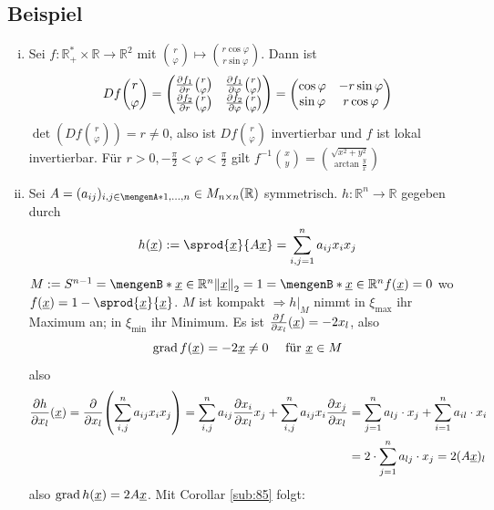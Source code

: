 \subsection{Beispiel} %
\label{sub:86}
\begin{enumerate}[(i)]
	\item Sei $f : \mathds{R}_+^* \times \mathds{R} \to \mathds{R}^2$ mit $\binom{r}{\varphi} \mapsto \binom{r \cos \varphi}{r \sin \varphi}  $. Dann ist
	\[
		D f \binom{r}{\varphi} = \begin{pmatrix}
			\frac{{\partial f_1}}{{\partial r}}  \binom{r}{\varphi}  & \frac{{\partial f_1}}{{\partial \varphi}}  \binom{r}{\varphi} \\
			\frac{{\partial f_2}}{{\partial r}}  \binom{r}{\varphi} & \frac{{\partial f_2}}{{\partial \varphi}}  \binom{r}{\varphi}     
		\end{pmatrix} = \begin{pmatrix}
			\cos \varphi & - r \sin \varphi \\
			\sin \varphi & r \cos \varphi
		\end{pmatrix}
	\]
	$\det (D f \binom{r}{\varphi} ) = r \not= 0$, also ist $D f \binom{r}{\varphi} $ invertierbar und $f$ ist lokal invertierbar. Für 
	$r>0, - \frac{\pi}{2} < \varphi < \frac{\pi}{2}$ gilt $f ^{-1} \binom{x}{y} = \binom{\sqrt{x^2+ y^2}}{\arctan \frac{y}{x} }    $
	\item Sei $A= (a_{ij})_{i,j \in \set{1, \ldots , n}}  \in M_{n\times n}(\mathds{R})$ symmetrisch. $h : \mathds{R}^n \to \mathds{R}$ gegeben durch
	\[
		h(\underline{x}) := \sprod{\underline{x}}{A \underline{x}} = \sum_{i,j =1}^{n} a_{ij} x_i x_j 
	\]
	$M:= S^{n-1} = \set[\underline{x} \in \mathds{R}^n]{ \norm[2]{\underline{x}} = 1 } = \set[\underline{x} \in \mathds{R}^n]{f(\underline{x})=0}  $ wo 
	$f(\underline{x}) = 1- \sprod{\underline{x}}{\underline{x}} $. $M$ ist kompakt $\Rightarrow h|_{M}$ nimmt in $\xi_{\max}$ ihr Maximum an; in $\xi_{\min}$ ihr Minimum.
	Es ist $\frac{{\partial f}}{{\partial x_l}}  (\underline{x})= - 2x_l $, also 
	\[
		\operatorname{grad} f(\underline{x}) = -2 \underline{x} \not= 0 \quad \text{ für } \underline{x} \in M
	\]
	also
	\begin{align*}
		\diff{h}{x_l}(\underline{x}) = \diff{}{x_l} \enbrace*{ \sum_{i,j}^{n} a_{ij} x_i x_j } = \sum_{i,j}^{n} a_{ij} \diff{x_i}{x_l} x_j + \sum_{i,j}^{n} a_{ij} x_i \diff{x_j}{x_l}  
		&= \sum_{j=1}^{n} a_{lj} \cdot x_j + \sum_{i=1}^{n} a_{il} \cdot x_i \\
		&= 2 \cdot \sum_{j=1}^{n} a_{lj}\cdot  x_j = 2 (A \underline{x})_l
	\end{align*}  
	also $\operatorname{grad} h (\underline{x}) = 2 A \underline{x}$. Mit Corollar \ref{sub:85} folgt: 

\end{enumerate}

